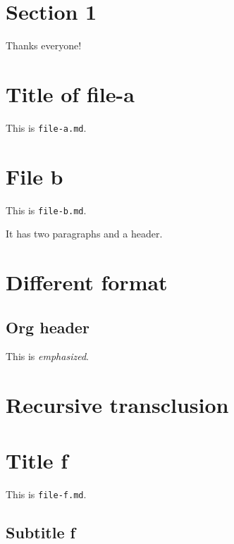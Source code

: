 \hypertarget{section-1}{%
\section{Section 1}\label{section-1}}

Thanks everyone!

\hypertarget{title-of-file-a}{%
\section{Title of file-a}\label{title-of-file-a}}

This is \texttt{file-a.md}.

\hypertarget{file-b}{%
\section{File b}\label{file-b}}

This is \texttt{file-b.md}.

It has two paragraphs and a header.

\hypertarget{different-format}{%
\section{Different format}\label{different-format}}

\hypertarget{org-header}{%
\subsection{Org header}\label{org-header}}

This is \emph{emphasized}.

\hypertarget{recursive-transclusion}{%
\section{Recursive transclusion}\label{recursive-transclusion}}

\hypertarget{title-f}{%
\section{Title f}\label{title-f}}

This is \texttt{file-f.md}.

\hypertarget{subtitle-f}{%
\subsection{Subtitle f}\label{subtitle-f}}

